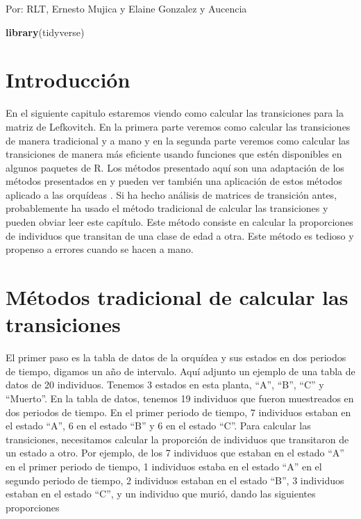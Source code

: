 \documentclass[
]{book}
\newenvironment{Shaded}{\begin{snugshade}}{\end{snugshade}}
\newcommand{\FunctionTok}[1]{\textcolor[rgb]{0.13,0.29,0.53}{\textbf{#1}}}
\newcommand{\NormalTok}[1]{#1}
\theoremstyle{definition}
\theoremstyle{definition}
\theoremstyle{definition}
\theoremstyle{definition}
\theoremstyle{remark}
\begin{document}
Por: RLT, Ernesto Mujica y Elaine Gonzalez y Aucencia

\begin{Shaded}
\begin{Highlighting}[]
\FunctionTok{library}\NormalTok{(tidyverse)}
\end{Highlighting}
\end{Shaded}

\section{Introducción}\label{introducciuxf3n}

En el siguiente capitulo estaremos viendo como calcular las transiciones para la matriz de Lefkovitch. En la primera parte veremos como calcular las transiciones de manera tradicional y a mano y en la segunda parte veremos como calcular las transiciones de manera más eficiente usando funciones que estén disponibles en algunos paquetes de R. Los métodos presentado aquí son una adaptación de los métodos presentados en \citep{caswell2000matrix} y pueden ver también una aplicación de estos métodos aplicado a las orquídeas \citep{tremblay2003population}. Si ha hecho análisis de matrices de transición antes, probablemente ha usado el método tradicional de calcular las transiciones y pueden obviar leer este capítulo. Este método consiste en calcular la proporciones de individuos que transitan de una clase de edad a otra. Este método es tedioso y propenso a errores cuando se hacen a mano.

\section{Métodos tradicional de calcular las transiciones}\label{muxe9todos-tradicional-de-calcular-las-transiciones}

El primer paso es la tabla de datos de la orquídea y sus estados en dos periodos de tiempo, digamos un año de intervalo. Aquí adjunto un ejemplo de una tabla de datos de 20 individuos. Tenemos 3 estados en esta planta, ``A'', ``B'', ``C'' y ``Muerto''. En la tabla de datos, tenemos 19 individuos que fueron muestreados en dos periodos de tiempo. En el primer periodo de tiempo, 7 individuos estaban en el estado ``A'', 6 en el estado ``B'' y 6 en el estado ``C''. Para calcular las transiciones, necesitamos calcular la proporción de individuos que transitaron de un estado a otro. Por ejemplo, de los 7 individuos que estaban en el estado ``A'' en el primer periodo de tiempo, 1 individuos estaba en el estado ``A'' en el segundo periodo de tiempo, 2 individuos estaban en el estado ``B'', 3 individuos estaban en el estado ``C'', y un individuo que murió, dando las siguientes proporciones
\end{document}
